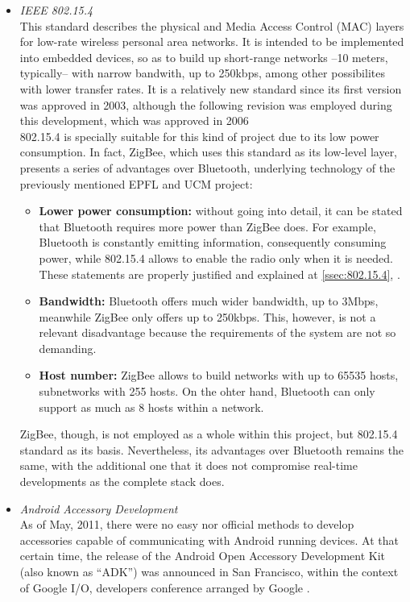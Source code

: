 \begin{itemize}
			\item \emph{IEEE 802.15.4}\\
				This standard describes the physical and Media Access Control (MAC) layers for low-rate wireless
				personal area networks. It is intended to be implemented into embedded devices, so as to build up
				short-range networks --10 meters, typically-- with narrow bandwith, up to 250kbps, among other
				possibilites with lower transfer rates. It is a relatively new standard since its first version
				was approved in 2003, although the following revision was employed during this development, which
				was approved in 2006 \cite{802.15.4}\\

				802.15.4 is specially suitable for this kind of project due to its low power consumption. In
				fact, ZigBee, which uses this standard as its low-level layer, presents a series of advantages
				over Bluetooth, underlying technology of the previously mentioned EPFL and UCM project:
				\begin{itemize}
					\item \textbf{Lower power consumption:} without going into detail, it can be stated that Bluetooth 
						requires more power than ZigBee does. For example, Bluetooth is constantly emitting information,
						consequently consuming power, while 802.15.4 allows to enable the radio only when it is needed.
						These statements are properly justified and explained at \autoref{ssec:802.15.4}, 
						.
					\item \textbf{Bandwidth:} Bluetooth offers much wider bandwidth, up to 3Mbps, meanwhile ZigBee 
						only offers up to 250kbps. This, however, is not a relevant disadvantage because the requirements
						of the system are not so demanding.
					\item \textbf{Host number:} ZigBee allows to build networks with up to 65535 hosts, subnetworks 
						with 255 hosts. On the ohter hand, Bluetooth can only support as much as 8 hosts within a 
						network. 
				\end{itemize}
				ZigBee, though, is not employed as a whole within this project, but 802.15.4 standard as
				its basis. Nevertheless, its advantages over Bluetooth remains the same, with the additional one
				that it does not compromise real-time developments as the complete stack does.\\
			\item \emph{Android Accessory Development}\\
				As of May, 2011, there were no easy nor official methods to develop accessories capable of 
				communicating with Android running devices. At that certain time, the release of the Android 
				Open Accessory Development Kit (also known as ``ADK'') \cite{ADK} was announced in San Francisco, 
				within the context of Google I/O, developers conference arranged by Google \cite{GoogleIO}.\\


\end{itemize}

